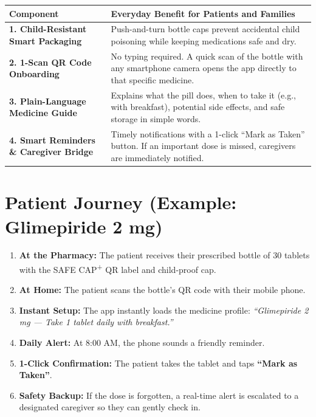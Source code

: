 \documentclass[11pt,a4paper]{article}
\begin{document}
\begin{center}
\renewcommand{\arraystretch}{1.4}
\begin{tabularx}{\textwidth}{|p{3.2cm}|X|}
\hline
\rowcolor{primary!10}
\textbf{Component} & \textbf{Everyday Benefit for Patients and Families} \\
\hline
\textbf{1. Child-Resistant Smart Packaging} & Push-and-turn bottle caps prevent accidental child poisoning while keeping medications safe and dry. \\
\hline
\textbf{2. 1-Scan QR Code Onboarding} & No typing required. A quick scan of the bottle with any smartphone camera opens the app directly to that specific medicine. \\
\hline
\textbf{3. Plain-Language Medicine Guide} & Explains what the pill does, when to take it (e.g., with breakfast), potential side effects, and safe storage in simple words. \\
\hline
\textbf{4. Smart Reminders \& Caregiver Bridge} & Timely notifications with a 1-click ``Mark as Taken'' button. If an important dose is missed, caregivers are immediately notified. \\
\hline
\end{tabularx}
\end{center}

\section{Patient Journey (Example: Glimepiride 2 mg)}
\begin{enumerate}[leftmargin=*,itemsep=4pt]
    \item \textbf{At the Pharmacy:} The patient receives their prescribed bottle of 30 tablets with the SAFE CAP\textsuperscript{+} QR label and child-proof cap.
    \item \textbf{At Home:} The patient scans the bottle's QR code with their mobile phone.
    \item \textbf{Instant Setup:} The app instantly loads the medicine profile: \textit{``Glimepiride 2 mg — Take 1 tablet daily with breakfast.''}
    \item \textbf{Daily Alert:} At 8:00 AM, the phone sounds a friendly reminder.
    \item \textbf{1-Click Confirmation:} The patient takes the tablet and taps \textbf{``Mark as Taken''}.
    \item \textbf{Safety Backup:} If the dose is forgotten, a real-time alert is escalated to a designated caregiver so they can gently check in.
\end{enumerate}
\end{document}

